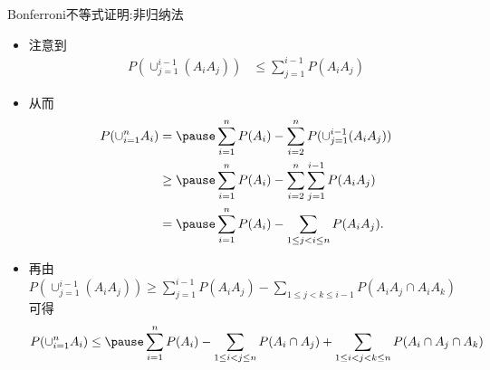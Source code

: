 	\begin{frame}{{\rm Bonferroni}不等式证明:非归纳法}
	\begin{itemize}[<+-|alert@+>]
		\item 注意到
		{\small \begin{align*}
			P(\cup_{j=1}^{i-1}(A_iA_j)) &\leq \sum_{j=1}^{i-1}P(A_iA_j)
		\end{align*}}
		\item 从而
		{\small \begin{align*}
			P(\cup_{i=1}^nA_i) &=\pause \sum_{i=1}^nP(A_i)-\sum_{i=2}^nP(\cup_{j=1}^{i-1}(A_iA_j)) \\
			&\geq\pause \sum_{i=1}^nP(A_i)-\sum_{i=2}^n\sum_{j=1}^{i-1}P(A_iA_j) \\
			&=\pause\sum_{i=1}^nP(A_i)-\sum_{1\leq j<i\leq n}P(A_iA_j).
		  \end{align*}}
		\item 再由{\small $P(\cup_{j=1}^{i-1}(A_iA_j)) \geq \sum_{j=1}^{i-1}P(A_iA_j)-\sum_{1\leq j<k\leq i-1}P(A_iA_j\cap A_iA_k)$}可得\pause
		{\small \begin{align*}
			P(\cup_{i=1}^nA_i)\leq\pause \sum_{i=1}^{n} P(A_{i})-\sum_{1\leq i<j\leq n} P(A_{i} \cap A_{j})+\sum_{1\leq i<j<k\leq n}P(A_i\cap A_j\cap A_k)
		\end{align*}}
	\end{itemize}

	\end{frame}






